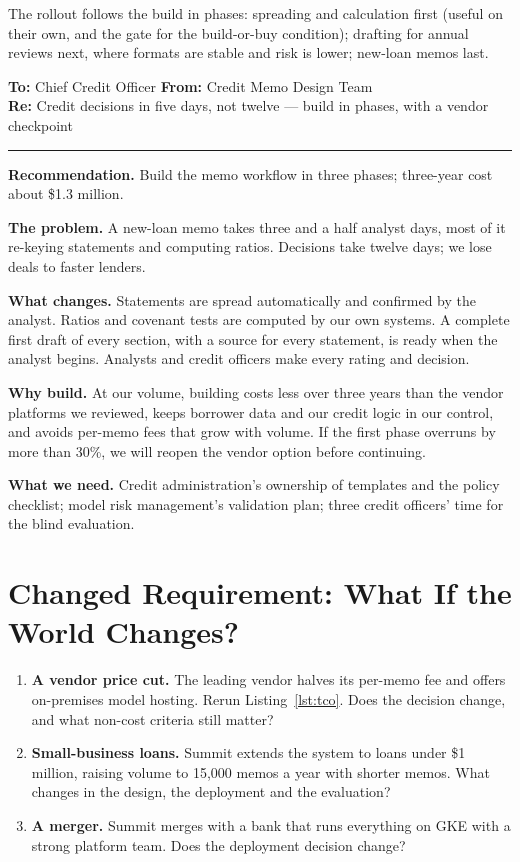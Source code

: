 The rollout follows the build in phases: spreading and calculation first (useful on their own, and the gate for the build-or-buy condition); drafting for annual reviews next, where formats are stable and risk is lower; new-loan memos last.

\begin{tcolorbox}[colback=white, colframe=black!60, boxrule=0.6pt, arc=1pt, left=10pt, right=10pt, top=8pt, bottom=8pt, fontupper=\small]
\textbf{To:} Chief Credit Officer \hfill \textbf{From:} Credit Memo Design Team\\
\textbf{Re:} Credit decisions in five days, not twelve --- build in phases, with a vendor checkpoint

\smallskip\hrule\smallskip

\textbf{Recommendation.} Build the memo workflow in three phases; three-year cost about \$1.3 million.

\textbf{The problem.} A new-loan memo takes three and a half analyst days, most of it re-keying statements and computing ratios. Decisions take twelve days; we lose deals to faster lenders.

\textbf{What changes.} Statements are spread automatically and confirmed by the analyst. Ratios and covenant tests are computed by our own systems. A complete first draft of every section, with a source for every statement, is ready when the analyst begins. Analysts and credit officers make every rating and decision.

\textbf{Why build.} At our volume, building costs less over three years than the vendor platforms we reviewed, keeps borrower data and our credit logic in our control, and avoids per-memo fees that grow with volume. If the first phase overruns by more than 30\%, we will reopen the vendor option before continuing.

\textbf{What we need.} Credit administration's ownership of templates and the policy checklist; model risk management's validation plan; three credit officers' time for the blind evaluation.
\end{tcolorbox}

\section{Changed Requirement: What If the World Changes?}
\label{sec:loan-changed}

\begin{enumerate}[itemsep=3pt]
  \item \textbf{A vendor price cut.} The leading vendor halves its per-memo fee and offers on-premises model hosting. Rerun Listing~\ref{lst:tco}. Does the decision change, and what non-cost criteria still matter?
  \item \textbf{Small-business loans.} Summit extends the system to loans under \$1 million, raising volume to 15{,}000 memos a year with shorter memos. What changes in the design, the deployment and the evaluation?
  \item \textbf{A merger.} Summit merges with a bank that runs everything on GKE with a strong platform team. Does the deployment decision change?
\end{enumerate}

